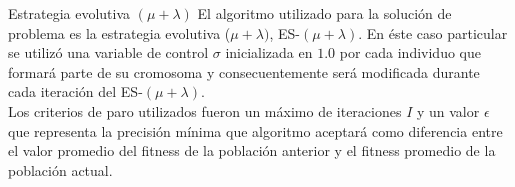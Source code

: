 \documentclass[10pt, letterpaper]{article}
\theoremstyle{definition}
\begin{document}
\begin{section}{Estrategia evolutiva $(\mu + \lambda)$}
    El algoritmo utilizado para la solución de problema es la
    estrategia evolutiva ($\mu + \lambda)$,  ES-$(\mu + \lambda)$. En éste caso
    particular se utilizó una variable de control $\sigma$ inicializada en $1.0$
    por cada individuo que formará parte de su cromosoma y consecuentemente será
    modificada durante cada iteración del ES-$(\mu + \lambda)$.\\

    Los criterios de paro utilizados fueron un máximo de iteraciones $I$ y un
    valor $\epsilon$ que representa la precisión mínima que algoritmo aceptará
    como diferencia entre el valor promedio del fitness de la población anterior
    y el fitness promedio de la población actual.\\


\end{section}
\end{document}
